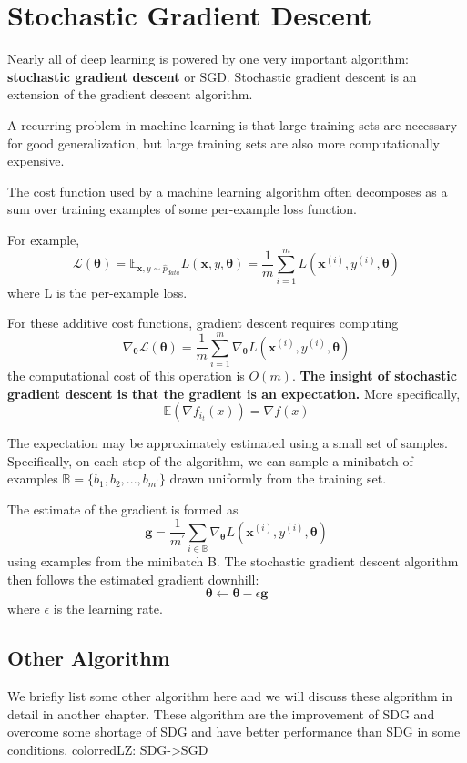 \section{Stochastic Gradient Descent}

    Nearly all of deep learning is powered by one very important algorithm: \textbf{stochastic gradient descent} or SGD. Stochastic gradient descent is an extension of the	gradient descent algorithm.
    
    A recurring problem in machine learning is that large training sets are necessary for good generalization, but large training sets are also more computationally expensive.
    
    The cost function used by a machine learning algorithm often decomposes as a	sum over training examples of some per-example loss function.
    
     For example,
        $$
        \mathcal L(\bm\theta)=
        \mathbb E_{\mathbf{x},y \sim \hat{p}_{data}}L(\mathbf{x},y,\bm{\theta})
        =\dfrac1m \sum^m_{i=1}L(\mathbf{x}^{(i)},y^{(i)},\bm{\theta})
        $$
        where L is the per-example loss.
    
    For these additive cost functions, gradient descent requires computing
        $$
        \nabla_{\bm{\theta}}\mathcal L(\bm\theta)=\dfrac1m \sum^m_{i=1}\nabla_{\bm{\theta}}L(\mathbf{x}^{(i)},y^{(i)},\bm{\theta})
        $$
        the  computational cost of this operation is $O(m)$. 
    \textbf{The insight of stochastic gradient descent is that the gradient is an expectation.}   More specifically, 
    $$
    \mathbb E(\nabla f_{i_t}(x))=\nabla f(x)
    $$
    
    The expectation may be approximately estimated using a small set of samples. Specifically, on each step of the algorithm, we can sample a minibatch of examples $\mathbb{B}  = \{ b_1 ,b_2 ,...,b_{m^{'}}\}$ drawn uniformly from the training set.

    The estimate of the gradient is formed as 
        $$
        \mathbf{g} = \dfrac{1}{m^{'}} \sum_{i\in \mathbb{B}} \nabla_{\bm{\theta}}L(\mathbf{x}^{(i)},y^{(i)},\bm{\theta})
        $$
        using examples from the minibatch B.
     The stochastic gradient descent algorithm
        then follows the estimated gradient downhill:
        $$
        \bm \theta \leftarrow \bm \theta -\epsilon \mathbf g
        $$
        where $\epsilon$ is the learning rate.


\subsection{Other Algorithm}
	We briefly list some other algorithm here and we will discuss these algorithm in detail in another chapter. These algorithm are the improvement of SDG and overcome some shortage of SDG and have better performance than SDG in some conditions. {color{red}LZ: SDG->SGD}\\
	

